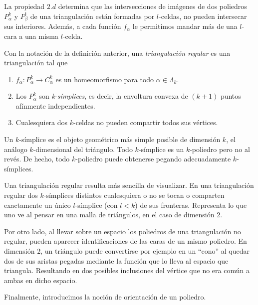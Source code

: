 La propiedad $2.d$ determina que las intersecciones de imágenes de dos poliedros $P^k_{\alpha}$ y $P^t_{\beta}$ de una triangulación están formadas por $l$-celdas, no pueden intersecar sus interiores. Además, a cada función $f_{\alpha}$ le permitimos mandar más de una $l$-cara a una misma $l$-celda.


\bigskip

\begin{definition}
    Con la notación de la definición anterior, una \textit{triangulación regular} es una triangulación tal que
    \begin{enumerate}
        \item $f_{\alpha}: P^k_{\alpha} \to C^k_{\alpha}$ es un homeomorfismo para todo $\alpha\in\Lambda_k$.
        \item Los $P^k_{\alpha}$ son \textit{k-símplices}, es decir, la envoltura convexa de $(k+1)$ puntos afínmente independientes.
        \item Cualesquiera dos $k$-celdas no pueden compartir todos sus vértices.
    \end{enumerate}
\end{definition}

\begin{remark}
    Un $k$-símplice es el objeto geométrico más simple posible de dimensión $k$, el análogo $k$-dimensional del triángulo. Todo $k$-símplice es un $k$-poliedro pero no al revés. De hecho, todo $k$-poliedro puede obtenerse pegando adecuadamente $k$-símplices.
\end{remark}

\bigskip

Una triangulación regular resulta más sencilla de visualizar. En una triangulación regular dos $k$-símplices distintos cualesquiera o no se tocan o comparten exactamente un único $l$-símplice (con $l<k$) de sus fronteras. Representa lo que uno ve al pensar en una malla de triángulos, en el caso de dimensión $2$. 

Por otro lado, al llevar sobre un espacio los poliedros de una triangulación no regular, pueden aparecer identificaciones de las caras de un mismo poliedro. En dimensión $2$, un triángulo puede convertirse por ejemplo en un ``cono'' al quedar dos de sus aristas pegadas mediante la función que lo lleva al espacio que triangula. Resultando en dos posibles inclusiones del vértice que no era común a ambas en dicho espacio.

\bigskip

Finalmente, introducimos la noción de orientación de un poliedro.

